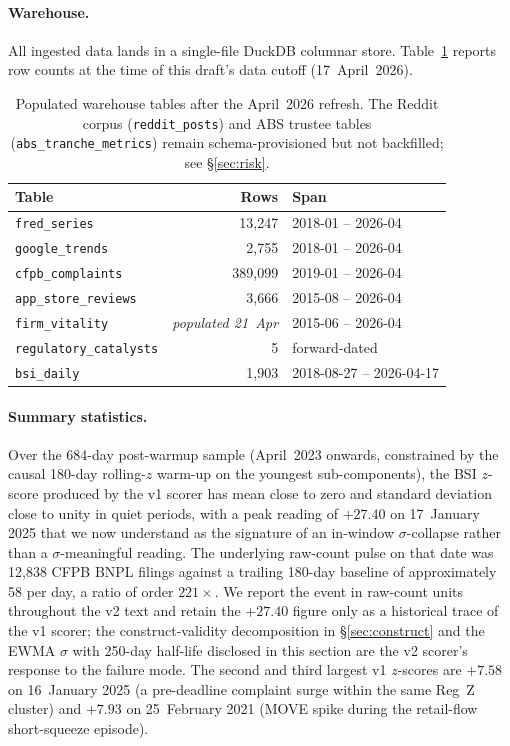 \documentclass[11pt,letterpaper]{article}
\begin{document}
\paragraph{Warehouse.}
All ingested data lands in a single-file DuckDB columnar store.
Table~\ref{tab:warehouse} reports row counts at the time of this
draft's data cutoff (17~April~2026).

\begin{table}[H]
\centering
\small
\begin{tabular}{lrl}
\toprule
\textbf{Table} & \textbf{Rows} & \textbf{Span} \\
\midrule
\texttt{fred\_series}            & 13{,}247 & 2018-01 -- 2026-04 \\
\texttt{google\_trends}          &  2{,}755 & 2018-01 -- 2026-04 \\
\texttt{cfpb\_complaints}        & 389{,}099 & 2019-01 -- 2026-04 \\
\texttt{app\_store\_reviews}     &  3{,}666 & 2015-08 -- 2026-04 \\
\texttt{firm\_vitality}          & \textit{populated 21~Apr} & 2015-06 -- 2026-04 \\
\texttt{regulatory\_catalysts}   &  5        & forward-dated \\
\texttt{bsi\_daily}              &  1{,}903 & 2018-08-27 -- 2026-04-17 \\
\bottomrule
\end{tabular}
\caption{Populated warehouse tables after the April~2026 refresh. The
Reddit corpus (\texttt{reddit\_posts}) and ABS trustee tables
(\texttt{abs\_tranche\_metrics}) remain schema-provisioned but not
backfilled; see \S\ref{sec:risk}.}
\label{tab:warehouse}
\end{table}

\paragraph{Summary statistics.}
Over the 684-day post-warmup sample (April~2023 onwards, constrained
by the causal 180-day rolling-$z$ warm-up on the youngest
sub-components), the BSI $z$-score produced by the v1 scorer has mean
close to zero and standard deviation close to unity in quiet periods,
with a peak reading of $+27.40$ on 17~January 2025 that we now
understand as the signature of an in-window $\sigma$-collapse rather
than a $\sigma$-meaningful reading. The underlying raw-count pulse on
that date was 12{,}838 CFPB BNPL filings against a trailing 180-day
baseline of approximately 58 per day, a ratio of order $221\times$.
We report the event in raw-count units throughout the v2 text and
retain the $+27.40$ figure only as a historical trace of the v1
scorer; the construct-validity decomposition in \S\ref{sec:construct}
and the EWMA $\sigma$ with 250-day half-life disclosed in this section
are the v2 scorer's response to the failure mode. The second and
third largest v1 $z$-scores are $+7.58$ on 16~January 2025 (a
pre-deadline complaint surge within the same Reg~Z cluster) and
$+7.93$ on 25~February 2021 (MOVE spike during the retail-flow
short-squeeze episode).
\end{document}
